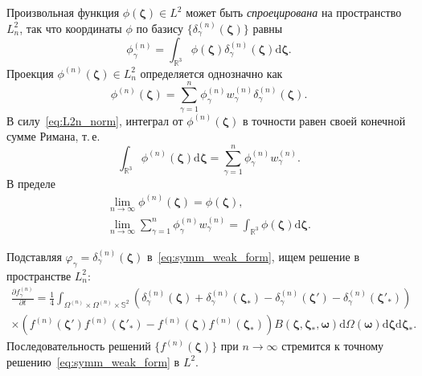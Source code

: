 \documentclass{article}
\newcommand{\dd}{\mathrm{d}}
\newcommand{\pder}[2][]{\frac{\partial#1}{\partial#2}}
\newcommand{\dzeta}{\boldsymbol{\dd\zeta}}
\newcommand{\bzeta}{\boldsymbol{\zeta}}
\newcommand{\bomega}{\boldsymbol{\omega}}
\begin{document}
Произвольная функция \(\phi(\bzeta) \in L^2\) может быть \emph{спроецирована} на пространство \(L^2_n\),
так что координаты \(\phi\) по базису \(\{\delta^{(n)}_\gamma(\bzeta)\}\) равны
\begin{equation}\label{eq:L2n_coords}
    \phi^{(n)}_\gamma = \int_{\mathbb{R}^3} \phi(\bzeta) \delta^{(n)}_\gamma(\bzeta) \dzeta.
\end{equation}
Проекция \(\phi^{(n)}(\bzeta) \in L^2_n\) определяется однозначно как
\begin{equation}\label{eq:L2n_expansion}
    \phi^{(n)}(\bzeta) = \sum_{\gamma=1}^n \phi^{(n)}_\gamma w^{(n)}_\gamma \delta^{(n)}_\gamma(\bzeta).
\end{equation}
В силу~\eqref{eq:L2n_norm}, интеграл от \(\phi^{(n)}(\bzeta)\) в точности равен своей конечной сумме Римана, т.\,е.
\begin{equation}\label{eq:Riemann_sum}
    \int_{\mathbb{R}^3} \phi^{(n)}(\bzeta) \dzeta = \sum_{\gamma=1}^n \phi^{(n)}_\gamma w^{(n)}_\gamma.
\end{equation}
В пределе
\begin{gather}
    \lim_{n\to\infty} \phi^{(n)}(\bzeta) = \phi(\bzeta), \label{function_limit}\\
    \lim_{n\to\infty} \sum_{\gamma=1}^n \phi^{(n)}_\gamma w^{(n)}_\gamma =
        \int_{\mathbb{R}^3} \phi(\bzeta) \dzeta. \label{eq:Riemann_sum_limit}
\end{gather}

Подставляя \(\varphi_\gamma = \delta^{(n)}_\gamma(\bzeta)\) в~\eqref{eq:symm_weak_form}, ищем решение в пространстве \(L^2_n\):
\begin{multline}\label{eq:L2n_Boltzmann}
    \pder[f^{(n)}_\gamma]{t} =
        \frac14\int_{\Omega^{(n)}\times\Omega^{(n)}\times\mathbb{S}^2}
        \left(\delta^{(n)}_\gamma(\bzeta)+\delta^{(n)}_\gamma(\bzeta_*)-\delta^{(n)}_\gamma(\bzeta')-\delta^{(n)}_\gamma(\bzeta'_*)\right) \\
        \times\left(f^{(n)}(\bzeta')f^{(n)}(\bzeta'_*)-f^{(n)}(\bzeta)f^{(n)}(\bzeta_*)\right) B(\bzeta,\bzeta_*,\bomega)
        \dd\Omega(\bomega)\dzeta\dzeta_*.
\end{multline}
Последовательность решений \(\{f^{(n)}(\bzeta)\}\) при \(n\to\infty\) стремится к точному решению~\eqref{eq:symm_weak_form} в \(L^2\).
\end{document}
